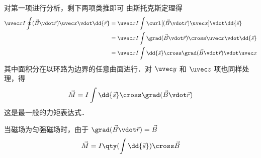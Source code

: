 对第一项进行分析，剩下两项类推即可
由斯托克斯定理得
\begin{equation}
\begin{aligned} 
\uvec x I \oint (\vec B \vdot \vec r)\uvec x \vdot \dd{\vec r}  &= \uvec x I \int \curl [ ( \vec B \vdot \vec r)\uvec x] \vdot \dd{\vec s} \\
&= \uvec x I \int \grad (\vec B \vdot \vec r) \cross \uvec x \vdot \dd{\vec s} \\
&= \uvec x I \int \dd{\vec s}  \cross \grad (\vec B \vdot \vec r) \vdot \uvec x 
\end{aligned} 
\end{equation}
其中面积分在以环路为边界的任意曲面进行．对 $\uvec y$ 和 $\uvec z$ 项也同样处理，得
\begin{equation}
\vec M = I \int \dd{\vec s}\cross\grad(\vec B\vdot\vec r)
\end{equation}
这是最一般的力矩表达式．

当磁场为匀强磁场时，由于 $\grad (\vec B \vdot \vec r) = \vec B$
\begin{equation}
\vec M = I \qty(\int \dd{\vec s}) \cross \vec B
\end{equation}







